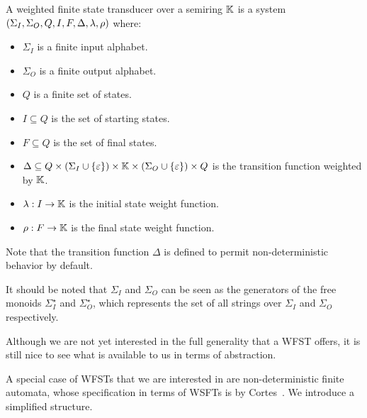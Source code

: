 \documentclass[12pt]{article}
\begin{document}
\begin{definition}
  A weighted finite state transducer over a semiring \(\mathbb{K}\) is
  a system
  \(\left(\Sigma_I, \Sigma_O, Q, I, F, \Delta, \lambda, \rho\right)\) where:

  \begin{itemize}
    \item
      \(\Sigma_I\) is a finite input alphabet.

    \item
      \(\Sigma_O\) is a finite output alphabet.

    \item
      \(Q\) is a finite set of states.

    \item
      \(I \subseteq Q\) is the set of starting states.

    \item
      \(F \subseteq Q\) is the set of final states.

    \item
      \(\Delta \subseteq
          Q \times
          \left(\Sigma_I \cup \left\{\varepsilon\right\}\right) \times
          \mathbb{K} \times
          \left(\Sigma_O \cup \left\{\varepsilon\right\}\right) \times
          Q \)
      is the transition function weighted by \(\mathbb{K}\).
        
    \item
      \(\lambda : I \to \mathbb{K}\) is the initial state weight function.

    \item
      \(\rho : F \to \mathbb{K}\) is the final state weight function.

    \end{itemize}

    Note that the transition function \(\Delta\) is defined to
    permit non-deterministic behavior by default.
\end{definition}

It should be noted that \(\Sigma_I\) and \(\Sigma_O\) can be
seen as the generators of the free monoids
\(\Sigma_I ^\star\) and \(\Sigma_O ^\star\),
which represents the set of all strings over
\(\Sigma_I\) and \(\Sigma_O\) respectively.

Although we are not yet interested in the full generality that
a WFST offers, it is still nice to see what is available to us
in terms of abstraction.

A special case of WFSTs that we are interested in
are non-deterministic finite automata,
whose specification in terms of WSFTs
is by Cortes~\cite{cortes2004rational}.
We introduce a simplified structure.
\end{document}
